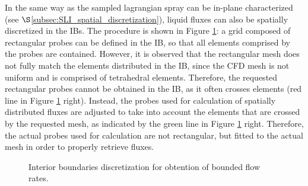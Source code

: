 In the same way as the sampled lagrangian spray can be in-plane characterized (see $\S$\ref{subsec:SLI_spatial_discretization}), liquid fluxes can also be spatially discretized in the IBs. The procedure is shown in Figure \ref{fig:jicf_IBs_sketch_discretization}: a grid composed of rectangular probes can be defined in the IB, so that all elements comprised by the probes are contained. However, it is observed that the rectangular mesh does not fully match the elements distributed in the IB, since the CFD mesh is not uniform and is comprised of tetrahedral elements. Therefore, the requested rectangular probes cannot be obtained in the IB, as it often crosses elements (red line in Figure \ref{fig:jicf_IBs_sketch_discretization} right). Instead, the probes used for calculation of spatially distributed fluxes are adjusted to take into account the elements that are crossed by the requested mesh, as indicated by the green line in Figure \ref{fig:jicf_IBs_sketch_discretization} right. Therefore, the actual probes used for calculation are not rectangular, but fitted to the actual mesh in order to properly retrieve fluxes. 


\begin{figure}[ht]
     \centering
     \caption{Interior boundaries discretization for obtention of bounded flow rates.}
      \label{fig:jicf_IBs_sketch_discretization}
\end{figure}










%




